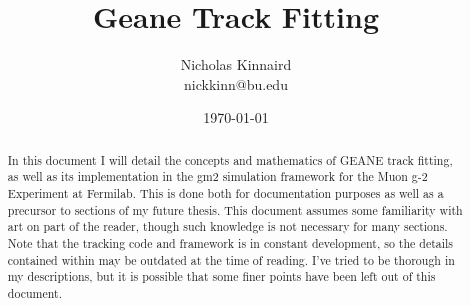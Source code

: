 \documentclass{article}
\begin{document}
\title{Geane Track Fitting}
\author{Nicholas Kinnaird \\ nickkinn@bu.edu}
\date{\today}
\maketitle

\begin{abstract}

    In this document I will detail the concepts and mathematics of GEANE track fitting, as well as its implementation in the gm2 simulation framework for the Muon g-2 Experiment at Fermilab. This is done both for documentation purposes as well as a precursor to sections of my future thesis. This document assumes some familiarity with art on part of the reader, though such knowledge is not necessary for many sections. Note that the tracking code and framework is in constant development, so the details contained within may be outdated at the time of reading. I've tried to be thorough in my descriptions, but it is possible that some finer points have been left out of this document.

\end{abstract}

\tableofcontents













% 







\printbibliography



\end{document}
